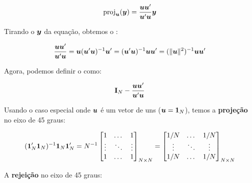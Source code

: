 \documentclass[11pt, oneside, a4paper, article]{article}
\numberwithin{equation}{section}
\begin{document}
\begin{description}
\vspace{-1 em}
\begin{align*}
	\text{proj}_{\boldsymbol{u}}(\boldsymbol{y}) =
	\frac{\boldsymbol{u} \boldsymbol{u}'}{\boldsymbol{u}'\boldsymbol{u}} \boldsymbol{y}
\end{align*}

\noindent
Tirando o $\boldsymbol{y}$ da equação, obtemos o  :

\vspace{-1 em}
\begin{align*}
	\frac{\boldsymbol{u} \boldsymbol{u}'}{\boldsymbol{u}'\boldsymbol{u}} 
	=
	\boldsymbol{u}(\boldsymbol{u}'\boldsymbol{u})^{-1} \boldsymbol{u}'
	=
	(\boldsymbol{u}'\boldsymbol{u})^{-1} \boldsymbol{u} \boldsymbol{u}'
	=
	(\|\boldsymbol{u} \|^2)^{-1} \boldsymbol{u} \boldsymbol{u}'
\end{align*}

Agora, podemos definir o  como:

\vspace{-1 em}
\begin{align*}
	\mathbf{I}_{N} - \frac{\boldsymbol{u} \boldsymbol{u}'}{\boldsymbol{u}'\boldsymbol{u}} 
\end{align*}

Usando o caso especial onde $\boldsymbol{u}$ é um vetor de uns ($\boldsymbol{u} = \boldsymbol{1}_{N}$), temos a \textbf{projeção} no eixo de 45 graus:

\vspace{-1 em}
\begin{align*}
	( \boldsymbol{1}_{N}' \boldsymbol{1}_{N} )^{-1} \boldsymbol{1}_{N} \boldsymbol{1}_{N}'
	=
	N^{-1} 
	\begin{bmatrix}
		1      & \dots  & 1	 \\
		\vdots & \ddots & \vdots \\
		1      & \dots  & 1	
	\end{bmatrix}_{N \times N}
	=
	\begin{bmatrix}
		1/N    & \dots  & 1/N	 \\
		\vdots & \ddots & \vdots \\
		1/N    & \dots  & 1/N	
	\end{bmatrix}_{N \times N}
\end{align*}

A \textbf{rejeição} no eixo de 45 graus:


\end{description}
\end{document}
